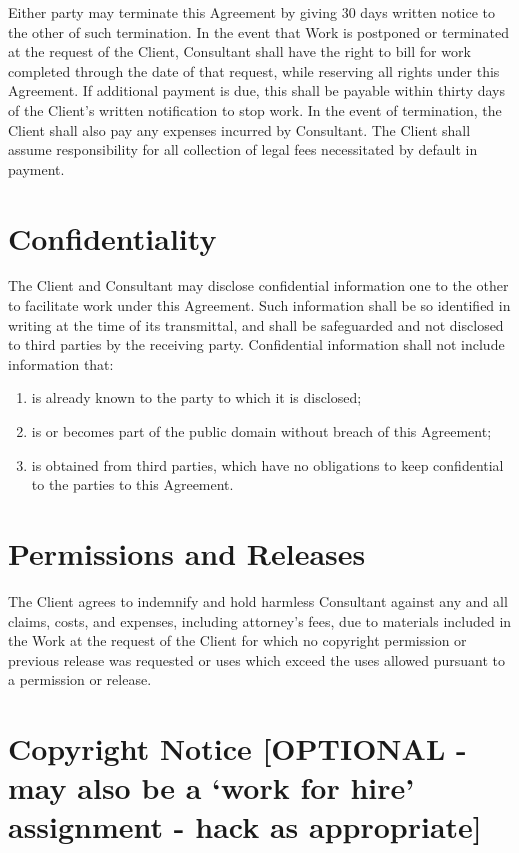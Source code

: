 \documentclass[10pt]{article}
\begin{document}
Either party may terminate this Agreement by giving 30 days written notice
to the other of such termination. In the event that Work is postponed or
terminated at the request of the Client, Consultant shall have the right to
bill %
for work completed through the date of that request, while
reserving all rights under this Agreement. If additional payment is due,
this shall be payable within thirty days of the Client's written
notification to stop work. In the event of termination, the Client shall
also pay any expenses incurred by Consultant.  The Client shall assume
responsibility for all collection of legal fees necessitated by default in
payment.




\section{Confidentiality}

The Client and Consultant may disclose confidential information one to the
other to facilitate work under this Agreement.  Such information shall be so
identified in writing at the time of its transmittal, and shall be
safeguarded and not disclosed to third parties by the receiving party.
Confidential information shall not include information that:

\begin{enumerate}
  \item is already known to the party to which it is disclosed; 
  \item is or becomes part of the public domain without breach of this Agreement;
  \item is obtained from third parties, which have no obligations to keep
    confidential to the parties to this Agreement. 
\end{enumerate}




\section{Permissions and Releases}

The Client agrees to indemnify and hold harmless Consultant against any and
all claims, costs, and expenses, including attorney's fees, due to materials
included in the Work at the request of the Client for which no copyright
permission or previous release was requested or uses which exceed the uses
allowed pursuant to a permission or release.  


\section{Copyright Notice [OPTIONAL - may also be a `work for hire' assignment - hack as appropriate]}
\end{document}
